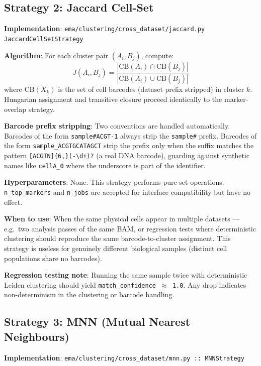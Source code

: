 \documentclass[11pt,a4paper]{article}
\begin{document}
\subsection{Strategy 2: Jaccard Cell-Set}
\label{sec:match_jaccard}

\textbf{Implementation}: \texttt{ema/clustering/cross\_dataset/jaccard.py}\\
\texttt{JaccardCellSetStrategy}

\textbf{Algorithm}: For each cluster pair $(A_i, B_j)$, compute:
\[
  J(A_i, B_j) = \frac{|\text{CB}(A_i) \cap \text{CB}(B_j)|}{|\text{CB}(A_i) \cup \text{CB}(B_j)|}
\]
where $\text{CB}(X_k)$ is the set of cell barcodes (dataset prefix stripped) in
cluster $k$. Hungarian assignment and transitive closure proceed identically to the
marker-overlap strategy.

\textbf{Barcode prefix stripping}: Two conventions are handled automatically.
Barcodes of the form \texttt{sample\#ACGT-1} always strip the \texttt{sample\#} prefix.
Barcodes of the form \texttt{sample\_ACGTGCATAGCT} strip the prefix only when the
suffix matches the pattern \texttt{[ACGTN]\{6,\}(-\textbackslash d+)?} (a real DNA
barcode), guarding against synthetic names like \texttt{cellA\_0} where the underscore
is part of the identifier.

\textbf{Hyperparameters}: None. This strategy performs pure set operations.
\texttt{n\_top\_markers} and \texttt{n\_jobs} are accepted for interface compatibility
but have no effect.

\textbf{When to use}: When the same physical cells appear in multiple datasets ---
e.g.\ two analysis passes of the same BAM, or regression tests where deterministic
clustering should reproduce the same barcode-to-cluster assignment. This strategy is
useless for genuinely different biological samples (distinct cell populations share
no barcodes).

\textbf{Regression testing note}: Running the same sample twice with deterministic
Leiden clustering should yield \texttt{match\_confidence $\approx$ 1.0}. Any drop
indicates non-determinism in the clustering or barcode handling.

\subsection{Strategy 3: MNN (Mutual Nearest Neighbours)}
\label{sec:match_mnn}

\textbf{Implementation}: \texttt{ema/clustering/cross\_dataset/mnn.py :: MNNStrategy}%
\end{document}
